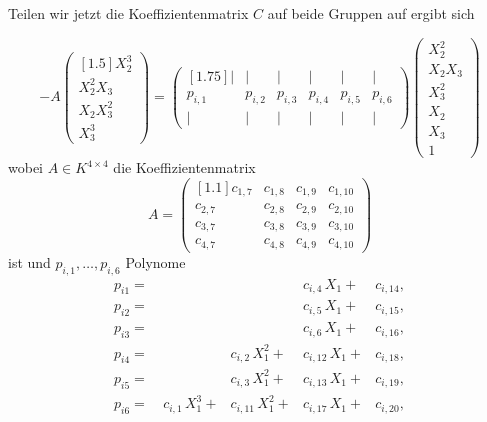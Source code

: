 \documentclass[a4paper,oneside, 11pt, openany%
]{article}
\theoremstyle{custom}
\theoremstyle{custom}
\begin{document}
Teilen wir jetzt die Koeffizientenmatrix $C$ auf beide Gruppen auf ergibt sich 

\begin{equation*}
	-A
	\begin{pmatrix}[1.5]
		X_{2}^3\\
		X_{2}^2X_{3}\\
		X_{2}X_{3}^2\\
		X_{3}^3
	\end{pmatrix}
	=
	\begin{pmatrix}[1.75]
		\vert & \vert & \vert & \vert & \vert& \vert \\
		p_{i,1}&p_{i,2}& p_{i,3}& p_{i,4}& p_{i,5}& p_{i,6}\\
		\vert & \vert & \vert & \vert & \vert& \vert
	\end{pmatrix}
	\begin{pmatrix}
		X_{2}^2\\
		X_{2}X_{3}\\
		X_{3}^2\\
		X_{2}\\
		X_{3}\\
		1
	\end{pmatrix}
\end{equation*}
wobei $A \in K^{4 \times 4}$ die Koeffizientenmatrix
\begin{equation}
	A = 
	\begin{pmatrix}[1.1]
		c_{1,7}& c_{1,8}& c_{1,9}& c_{1,10}\\
		c_{2,7}& c_{2,8}& c_{2,9}& c_{2,10}\\
		c_{3,7}& c_{3,8}& c_{3,9}& c_{3,10}\\
		c_{4,7}& c_{4,8}& c_{4,9}& c_{4,10}
	\end{pmatrix}
\end{equation}
ist und $p_{i,1}, \ldots, p_{i,6}$ Polynome
\begin{equation}
	\begin{alignedat}{4}
		p_{i1}= \ &&&c_{i,4}\,X_{1}+&c_{i,14},\\
		p_{i2}= \ &&&c_{i,5}\,X_{1}+&c_{i,15},\\
		p_{i3}= \ &&&c_{i,6}\,X_{1}+&c_{i,16},\\
		p_{i4}= \ &&c_{i,2}\,X_{1}^2+&c_{i,12}\,X_{1}+&c_{i,18},\\
		p_{i5}= \ &&c_{i,3}\,X_{1}^2+&c_{i,13}\,X_{1}+&c_{i,19},\\
		p_{i6}= \ &c_{i,1}\,X_{1}^3+&c_{i,11}\,X_{1}^2+&c_{i,17}\,X_{1}+&c_{i,20},
	\end{alignedat}
\end{equation}
\end{document}
